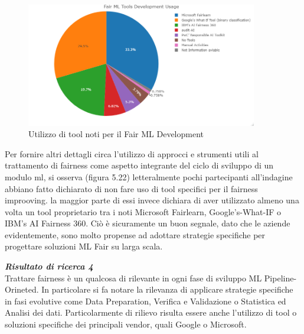    \begin{figure}[h!]
        \centering
        \includegraphics[width=0.9\textwidth]{figure/Analisi/RQ4/Fair ML Tools Development Usage.png}
        \caption{Utilizzo di tool noti per il Fair ML Development}
    \end{figure}
    
    Per fornire altri dettagli circa l'utilizzo di approcci e strumenti utili al trattamento di fairness come aspetto integrante del ciclo di sviluppo di un modulo ml, si osserva (figura 5.22) letteralmente pochi partecipanti all'indagine abbiano fatto dichiarato di non fare uso di tool specifici per il fairness improoving. la maggior parte di essi invece dichiara di aver utilizzato almeno una volta un tool proprietario tra i noti Microsoft Fairlearn, Google's-What-IF o IBM's AI Fairness 360. Ciò è sicuramente un buon segnale, dato che le aziende evidentemente, sono molto propense ad adottare strategie specifiche per progettare soluzioni ML Fair su larga scala.
    
    \begin{center}
	
        \begin{tcolorbox}[width=\textwidth, colframe=black, colback=Gray]
    			\begin{minipage}{\textwidth}
    				\textit{\faKey  \textbf{ Risultato di ricerca 4}}\\
    		     Trattare fairness è un qualcosa di rilevante in ogni fase di sviluppo ML Pipeline-Orineted. In particolare si fa notare la rilevanza di applicare strategie specifiche in fasi evolutive come Data Preparation, Verifica e Validazione o Statistica ed Analisi dei dati. Particolarmente di rilievo risulta essere anche l'utilizzo di tool o soluzioni specifiche dei principali vendor, quali Google o Microsoft. 
    			\end{minipage}
		\end{tcolorbox}
	\end{center}
	
